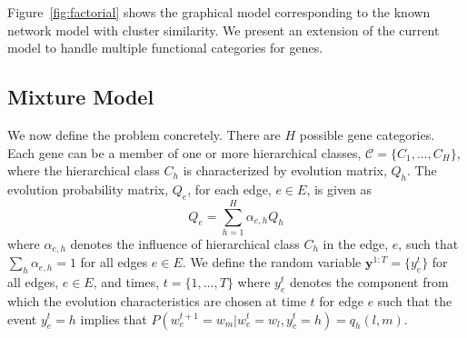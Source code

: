 \documentclass{bioinfo}
\begin{document}
\begin{methods}
Figure~\ref{fig:factorial} shows the graphical model corresponding to
the known network model with cluster similarity. We present an
extension of the current model to handle multiple functional
categories for genes.
 
\subsection{Mixture Model}
\label{sec:mixture-model}
We now define the problem concretely. There are $H$ possible gene
categories. Each gene can be a member of one or more hierarchical
classes, $\mathcal{C}=\{C_{1},\ldots , C_{H}\}$, where the
hierarchical class $C_{h}$ is characterized by evolution matrix,
$Q_{h}$. The evolution probability matrix, $Q_{e}$, for each edge,
$e\in E$, is given as 
\begin{equation}
  \label{eq:q-mixture}
  Q_{e} = \sum_{h=1}^{H} \alpha_{e,h} Q_{h}
\end{equation}
where $\alpha_{e,h}$ denotes the influence of hierarchical class
$C_{h}$ in the edge, $e$, such that $\sum_{h} \alpha_{e, h} = 1$
for all edges $e \in E$. We define the random variable
$\mathbf{y}^{1:T} = \{y_e^t\}$ for all edges, $e \in E$,  and times,
$t=\{1,\ldots, T\}$ where $y^t_e$
denotes the component from which the evolution characteristics are
chosen at time $t$ for edge $e$ such that the event $y_e^t = h$
implies that $P(w_e^{t+1}= w_m | w^t_e =w_l, y_e^t = h) = q_h(l, m)$.


\end{methods}
\end{document}

